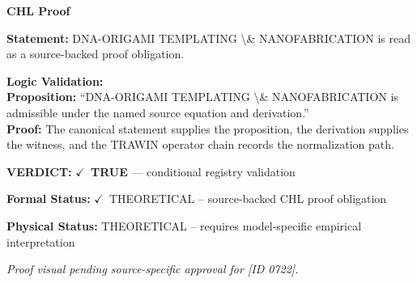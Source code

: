 \vspace{0.45em}
\noindent\textbf{CHL Proof}\par
\textbf{Statement:} DNA-ORIGAMI TEMPLATING \textbackslash{}\& NANOFABRICATION is read as a source-backed proof obligation.

\textbf{Logic Validation:}\\
\textbf{Proposition:} ``DNA-ORIGAMI TEMPLATING \textbackslash{}\& NANOFABRICATION is admissible under the named source equation and derivation.''\\
\textbf{Proof:} The canonical statement supplies the proposition, the derivation supplies the witness, and the TRAWIN operator chain records the normalization path.

\textbf{VERDICT:} \ensuremath{\checkmark}\ \textbf{TRUE} --- conditional registry validation

\textbf{Formal Status:} \ensuremath{\checkmark}\ THEORETICAL -- source-backed CHL proof obligation

\textbf{Physical Status:} THEORETICAL -- requires model-specific empirical interpretation
\par\vspace{0.45em}
\par
\vfill
\begingroup\footnotesize\itshape
Proof visual pending source-specific approval for [ID 0722].
\par\endgroup
\vfill
\endgroup
\endgroup
